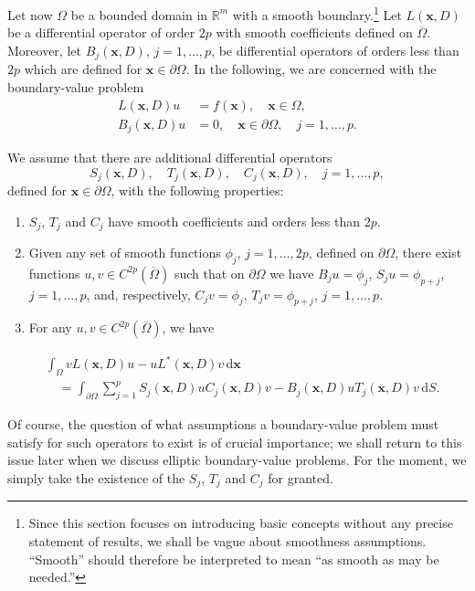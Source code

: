 Let now $\Omega$ be a bounded domain in $\mathbb{R}^m$ with a smooth boundary.\footnote{Since this section focuses on introducing basic concepts without any precise statement of results, we shall be vague about smoothness assumptions. ``Smooth'' should therefore be interpreted to mean ``as smooth as may be needed.''} Let $L(\bm{x},D)$ be a differential operator of order $2p$ with smooth coefficients defined on $\overline\Omega$. Moreover, let $B_j(\bm{x},D)$, $j=1,\ldots,p$, be differential operators of orders less than $2p$ which are defined for $\bm{x}\in\partial\Omega$. In the following, we are concerned with the boundary-value problem
\begin{equation}\label{eq:general-homogeneous-boundary-value-problem}
\begin{aligned}
L(\bm{x},D)u&=f(\bm{x}),\quad\bm{x}\in\Omega,\\
B_j(\bm{x},D)u&=0,\quad\bm{x}\in\partial\Omega,\quad j=1,\ldots,p.
\end{aligned}
\end{equation}


We assume that there are additional differential operators \[S_j(\bm{x},D),\quad T_j(\bm{x},D),\quad C_j(\bm{x},D),\quad j=1,\ldots,p,\] defined for $\bm{x}\in\partial\Omega$, with the following properties:\begin{enumerate}
\item $S_j$, $T_j$ and $C_j$ have smooth coefficients and orders less than $2p$.
\item Given any set of smooth functions $\phi_j$, $j=1,\ldots,2p$, defined on $\partial\Omega$, there exist functions $u,v\in C^{2p}(\overline\Omega)$ such that on $\partial\Omega$ we have $B_ju=\phi_j$, $S_ju=\phi_{p+j}$, $j=1,\ldots,p$, and, respectively, $C_jv=\phi_j$, $T_jv=\phi_{p+j}$, $j=1,\ldots,p$.
\item For any $u,v\in C^{2p}(\overline\Omega)$, we have
\end{enumerate}
\begin{equation}\label{eq:general-boundary-operator-green-identity}
\begin{aligned}
&\int_\Omega vL(\bm{x},D)u-uL^*(\bm{x},D)v\,\mathrm{d}\bm{x}\\
&\quad=\int_{\partial\Omega}\sum_{j=1}^p S_j(\bm{x},D)uC_j(\bm{x},D)v
-B_j(\bm{x},D)uT_j(\bm{x},D)v\,\mathrm{d}S.
\end{aligned}
\end{equation}


Of course, the question of what assumptions a boundary-value problem must satisfy for such operators to exist is of crucial importance; we shall return to this issue later when we discuss elliptic boundary-value problems. For the moment, we simply take the existence of the $S_j$, $T_j$ and $C_j$ for granted.

